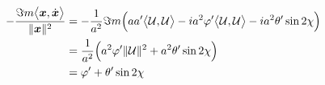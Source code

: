 \begin{annexe}
\begin{demo}
	\begin{align*}
		-\frac{\Im m\big\langle \bf{x},\dot{\bf{x}}\big\rangle}{\|\bf{x}\|^2} &= -\frac{1}{a^2}\Im m\Big(aa' \big\langle \mathcal{U}, \mathcal{U}\big\rangle  - ia^2\varphi' \big\langle \mathcal{U}, \mathcal{U}\big\rangle - ia^2\theta' \sin2\chi \Big) \\
		&= \frac{1}{a^2} \Big( a^2\varphi' \|\mathcal{U}\|^2 + a^2\theta' \sin2\chi \Big) \\
		&= \varphi' + \theta' \sin2\chi
	\end{align*}
	\\
	

\end{demo}
\end{annexe}
